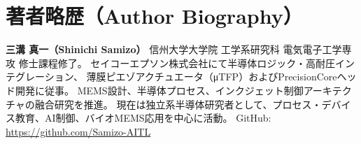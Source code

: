 \documentclass[conference]{IEEEtran}
\begin{document}
\section*{著者略歴（Author Biography）}
\textbf{三溝 真一（Shinichi Samizo）} 信州大学大学院 工学系研究科 電気電子工学専攻 修士課程修了。  
セイコーエプソン株式会社にて半導体ロジック・高耐圧インテグレーション、
薄膜ピエゾアクチュエータ（μTFP）およびPrecisionCoreヘッド開発に従事。  
MEMS設計、半導体プロセス、インクジェット制御アーキテクチャの融合研究を推進。  
現在は独立系半導体研究者として、プロセス・デバイス教育、AI制御、バイオMEMS応用を中心に活動。  
GitHub: \url{https://github.com/Samizo-AITL}
\end{document}
